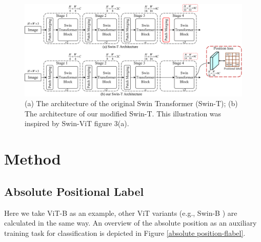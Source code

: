 \documentclass{article}
\begin{document}
\begin{figure}[t]
\centering
\includegraphics[width=0.9\linewidth]{swinT.pdf} %
\caption{(a) The architecture of the original Swin Transformer (Swin-T); (b) The architecture of our modified Swin-T. This illustration was inspired by Swin-ViT figure 3(a).}
\label{modified SwinT-flabel}
\end{figure}

\section{Method}

\subsection{Absolute Positional Label} 

Here we take ViT-B \cite{DBLP:journals/corr/abs-2010-11929} as an example, other ViT variants (e.g., Swin-B \cite{Liu_2021_ICCV}) are calculated in the same way. An overview of the absolute position as an auxiliary training task for classification is depicted in Figure \ref{absolute position-flabel}. 
\end{document}
